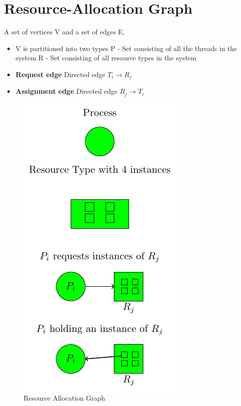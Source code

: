 \documentclass[oneside]{book}
\begin{document}
        \section{Resource-Allocation Graph}
            A set of vertices V and a set of edges E.
            \begin{itemize}
                \item V is partitioned into two types
                    \subitem P - Set consisting of all the threads in the system
                    \subitem R - Set consisting of all resource types in the system
                \item \textbf{Request edge}
                    \subitem Directed edge $T_i \rightarrow R_j$
                \item \textbf{Assignment edge}
                    \subitem Directed edge $R_j \rightarrow T_i$
            \end{itemize}
            \begin{figure}[H]
                \centering
                \includegraphics{figures/resource_allocation_graph.pdf}
                \caption{Resource Allocation Graph}
            \end{figure}
\end{document}
